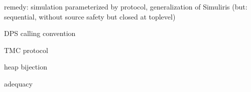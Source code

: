 remedy: simulation parameterized by protocol, generalization of Simuliris (but: sequential, without source safety but closed at toplevel)



%
%
%
%

DPS calling convention

TMC protocol


heap bijection


adequacy


